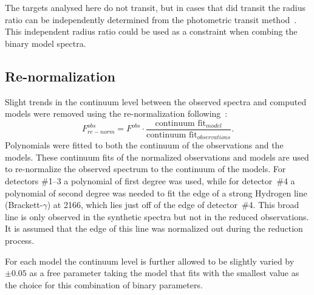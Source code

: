 The targets analysed here do not transit, but in cases that did transit the radius ratio can be independently determined from the photometric transit method~\citep{deeg_photometric_1998}.
This independent radius ratio could be used as a constraint when combing the binary model spectra.


\subsection{Re-normalization}
\label{subsec:renorm}
Slight trends in the continuum level between the observed spectra and computed models were removed using the re-normalization following~\citet{passegger_fundamental_2016}:
\begin{equation}
F^{obs}_{re-norm} = F^{obs} \cdot \frac{\textrm{continuum fit}_{model}}{\textrm{continuum fit}_{observations}}.
\end{equation}
Polynomials were fitted to both the continuum of the observations and the models.
These continuum fits of the normalized observations and models are used to re-normalize the observed spectrum to the continuum of the models.
For detectors \#1--3 a polynomial of first degree was used, while for detector~\#4 a polynomial of second degree was needed to fit the edge of a strong Hydrogen line (Brackett-\(\gamma\)) at 2166\nm{}, which lies just off of the edge of detector~\#4.
This broad line is only observed in the synthetic spectra but not in the reduced observations.
It is assumed that the edge of this line was normalized out during the reduction process.

For each model the continuum level is further allowed to be slightly varied by \(\pm0.05\) as a free parameter taking the model that fits with the smallest \textchisquared{} value as the choice for this combination of binary parameters.



